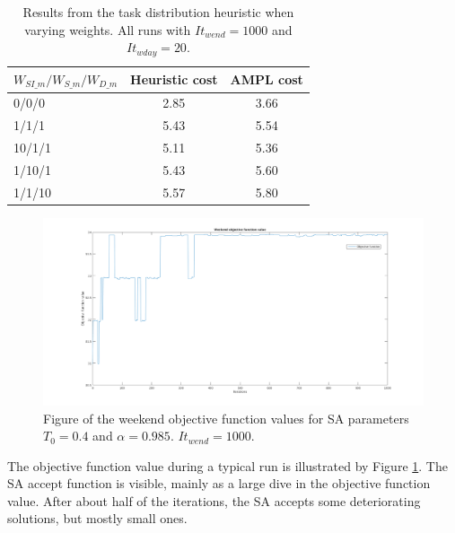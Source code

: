 \begin{table}[!h]
\centering
\label{tab:taskdist_weights_res}
\caption{Results from the task distribution heuristic when varying weights. All runs with $It_{wend} = 1000$ and $It_{wday} = 20$.}
\begin{tabular}{|l|l|l|}
\hline
\rowcolor{Gray} \textbf{$W_{SI\_m}/W_{S\_m}/W_{D\_m}$} & \textbf{Heuristic cost} &  \textbf{AMPL cost} \\ \hline
\cellcolor{Gray} 0/0/0 & \multicolumn{1}{c|}{2.85} & \multicolumn{1}{c|}{3.66}  \\
\cellcolor{Gray} 1/1/1 & \multicolumn{1}{c|}{5.43} & \multicolumn{1}{c|}{5.54}  \\
\cellcolor{Gray} 10/1/1 & \multicolumn{1}{c|}{5.11} & \multicolumn{1}{c|}{5.36}  \\
\cellcolor{Gray} 1/10/1 & \multicolumn{1}{c|}{5.43} & \multicolumn{1}{c|}{5.60}  \\
\cellcolor{Gray} 1/1/10 & \multicolumn{1}{c|}{5.57} & \multicolumn{1}{c|}{5.80} \\
\hline
\end{tabular}
\end{table}


\begin{figure}[!h]
\centering
\includegraphics[width=\textwidth, trim = 100px 50px 100px 20px, clip]{Chapters/ImagesEmelie/Plot_1000_20.png}
\caption{Figure of the weekend objective function values for SA parameters $T_0 = 0.4$ and $\alpha = 0.985$. $It_{wend} = 1000$.}
\label{fig:obj_fun_vals}
\end{figure}

The objective function value during a typical run is illustrated by Figure \ref{fig:obj_fun_vals}. The SA accept function is visible, mainly as a large dive in the objective function value. After about half of the iterations, the SA accepts some deteriorating solutions, but mostly small ones.

